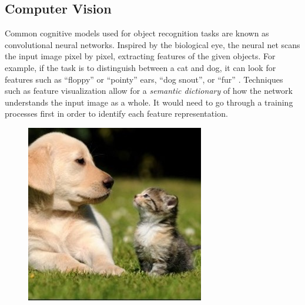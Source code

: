 \documentclass[12pt]{article}
\begin{document}
\subsection{Computer Vision}
Common cognitive models used for object recognition tasks are known as convolutional neural networks. Inspired by the biological eye, the neural net scans the input image pixel by pixel, extracting features of the given objects. 
For example, if the task is to distinguish between a cat and dog, it can look for features such as “floppy” or “pointy” ears, “dog snout”, or “fur” \cite{c14}. Techniques such as feature visualization allow for a \emph{semantic dictionary} of how the network understands the input image as a whole. It would need to go through a training processes first in order to identify each feature representation.
\newpage
\begin{figure}[ht!]
  \centering
  \begin{minipage}[b]{0.4\textwidth}
    \includegraphics[width=\textwidth]{animals.JPG}
    \caption{}
    \label{fig:animals}
  \end{minipage}
  \hfill
  \begin{minipage}[b]{0.4\textwidth}

\end{minipage}
\end{figure}
\end{document}
